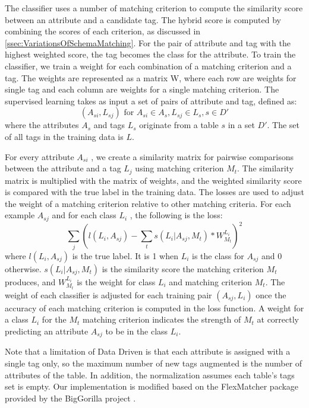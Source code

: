The classifier uses a number of matching criterion to compute the similarity score between an attribute and a candidate tag. The hybrid score is computed by combining the scores of each criterion, as discussed in \autoref{ssec:VariationsOfSchemaMatching}. For the pair of attribute and tag with the highest weighted score, the tag becomes the class for the attribute. To train the classifier, we train a weight for each combination of a matching criterion and a tag. The weights are represented as a matrix W, where each row are weights for single tag and each column are weights for a single matching criterion. The supervised learning takes as input a set of pairs of attribute and tag, defined as:
\[
(A_{si}, L_{sj})\text{ for }A_{si}\in A_{s}, L_{sj}\in L_{s}, s\in D'
\]
where the attributes $A_s$ and tags $L_s$ originate from a table $s$ in a set ${D'}$. The set of all tags in the training data is $L$.

For every attribute $A_{si}$ , we create a similarity matrix for pairwise comparisons between the attribute and a tag $L_j$ using matching criterion $M_t$. The similarity matrix is multiplied with the matrix of weights, and the weighted similarity score is compared with the true label in the training data. The losses are used to adjust the weight of a matching criterion relative to other matching criteria. For each example $A_{sj}$ and for each class $L_i$ , the following is the loss: 
\[
\sum_{j}(l(L_{i},A_{sj})-\sum_{t}s(L_{i}|A_{sj},M_{t})\ast W_{M_{t}}^{L_{i}})^{2}
\]
where $l(L_{i},A_{sj})$ is the true label. It is 1 when $L_{i}$ is the class for $A_{sj}$ and 0 otherwise. $s(L_{i}|A_{sj},M_{t})$ is the similarity score the matching criterion $M_{t}$ produces, and $W_{M_{t}}^{L_{i}}$ is the weight for class $L_{i}$ and matching criterion $M_{t}$. The weight of each classifier is adjusted for each training pair $(A_{sj}, L_{i})$ once the accuracy of each matching criterion is computed in the loss function. A weight for a class $L_{i}$ for the $M_{t}$ matching criterion indicates the strength of $M_{t}$ at correctly predicting an attribute $A_{sj}$ to be in the class $L_{i}$.

Note that a limitation of Data Driven is that each attribute is assigned with a single tag only, so the maximum number of new tags augmented is the number of attributes of the table. In addition, the normalization assumes each table's tags set is empty. Our implementation is modified based on the FlexMatcher package provided by the BigGorilla project \cite{DBLP:journals/debu/ChenGHTD18}.

